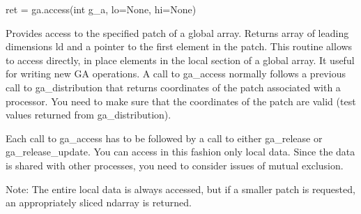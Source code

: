 \documentclass[12pt]{article}
\begin{document}
\begin{pyapi}
\begin{pycode}
ret = ga.access(int g_a, lo=None, hi=None)
\end{pycode}
\begin{funcargs}
\end{funcargs}
\end{pyapi}

\local

\begin{desc}

Provides access to the specified patch of a global array. Returns array of
leading dimensions ld and a pointer to the first element in the patch.  This
routine allows to access directly, in place elements in the local section of a
global array. It useful for writing new GA operations. A call to ga_access
normally follows a previous call to ga_distribution that returns coordinates of
the patch associated with a processor. You need to make sure that the
coordinates of the patch are valid (test values returned from ga_distribution).

Each call to ga_access has to be followed by a call to either ga_release or
ga_release_update. You can access in this fashion only local data.  Since the
data is shared with other processes, you need to consider issues of mutual
exclusion.

\end{desc}

\begin{pydesc}
Note: The entire local data is always accessed, but if a smaller patch is
requested, an appropriately sliced ndarray is returned.
\end{pydesc}
\end{document}
